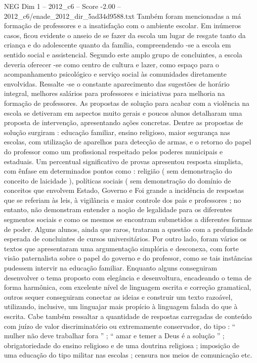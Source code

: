 \begin{textsample}{NEG Dim 1 – 2012\_c6 – Score -2.00 – 2012\_c6/enade\_2012\_dir\_5ad34d9588.txt}
Também foram mencionadas a má formação de professores e a insatisfação com o ambiente escolar.
Em inúmeros casos, ficou evidente o anseio de se fazer da escola um lugar de resgate tanto da criança e do adolescente quanto da família, compreendendo -se a escola em sentido social e assistencial.
Segundo este amplo grupo de concluintes, a escola deveria oferecer -se como centro de cultura e lazer, como espaço para o acompanhamento psicológico e serviço social às comunidades diretamente envolvidas.
Ressalte -se o constante aparecimento das sugestões de horário integral, melhores salários para professores e iniciativas para melhoria na formação de professores.
As propostas de solução para acabar com a violência na escola se detiveram em aspectos muito gerais e poucos alunos detalharam uma proposta de intervenção, apresentando ações concretas.
Dentre as propostas de solução surgiram : educação familiar, ensino religioso, maior segurança nas escolas, com utilização de aparelhos para detecção de armas, e o retorno do papel do professor como um profissional respeitado pelos poderes municipais e estaduais.
Um percentual significativo de provas apresentou resposta simplista, com ênfase em determinados pontos como : religião ( sem demonstração do conceito de laicidade ), políticas sociais ( sem demonstração do domínio de conceitos que envolvem Estado, Governo e Foi grande a incidência de respostas que se referiam às leis, à vigilância e maior controle dos pais e professores ; no entanto, não demonstram entender a noção de legalidade para os diferentes segmentos sociais e como os mesmos se encontram submetidos a diferentes formas de poder.
Alguns alunos, ainda que raros, trataram a questão com a profundidade esperada de concluintes de cursos universitários.
Por outro lado, foram vários os textos que apresentaram uma argumentação simplória e desconexa, com forte visão paternalista sobre o papel do governo e do professor, como se tais instâncias pudessem intervir na educação familiar.
Enquanto alguns conseguiram desenvolver o tema proposto com elegância e desenvoltura, encadeando o tema de forma harmônica, com excelente nível de linguagem escrita e correção gramatical, outros sequer conseguiram conectar as ideias e construir um texto razoável, utilizando, inclusive, um linguajar mais propício à linguagem falada do que à escrita.
Cabe também ressaltar a quantidade de respostas carregadas de conteúdo com juízo de valor discriminatório ou extremamente conservador, do tipo : “ mulher não deve trabalhar fora ” ; “ amar e temer a Deus é a solução ” ; obrigatoriedade do ensino religioso e de uma doutrina religiosa ; imposição de uma educação do tipo militar nas escolas ; censura nos meios de comunicação etc.

\end{textsample}
